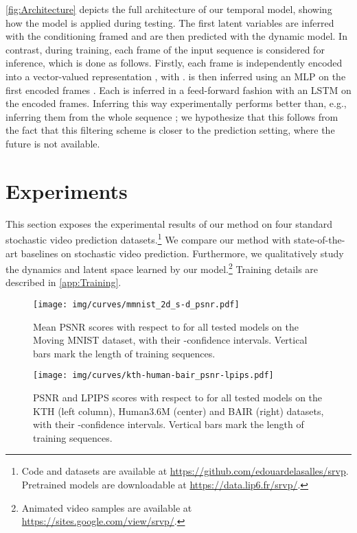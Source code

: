 \documentclass{article}
\begin{document}
\cref{fig:Architecture} depicts the full architecture of our temporal model, showing how the model is applied during testing.
The first latent variables are inferred with the conditioning framed and are then predicted with the dynamic model.
In contrast, during training, each frame of the input sequence is considered for inference, which is done as follows.
Firstly, each frame  is independently encoded into a vector-valued representation , with .
 is then inferred using an MLP on the first  encoded frames .
Each  is inferred in a feed-forward fashion with an LSTM on the encoded frames.
Inferring  this way experimentally performs better than, e.g., inferring them from the whole sequence ; we hypothesize that this follows from the fact that this filtering scheme is closer to the prediction setting, where the future is not available.
 
\section{Experiments}
\label{sec:Experiments}

This section exposes the experimental results of our method on four standard stochastic video prediction datasets.\footnote{Code and datasets are available at \url{https://github.com/edouardelasalles/srvp}. Pretrained models are downloadable at \url{https://data.lip6.fr/srvp/}.}
We compare our method with state-of-the-art baselines on stochastic video prediction.
Furthermore, we qualitatively study the dynamics and latent space learned by our model.\footnote{Animated video samples are available at \url{https://sites.google.com/view/srvp/}.}
Training details are described in \cref{app:Training}.

\begin{figure*}
    \centering
    \texttt{[image: img/curves/mmnist\_2d\_s-d\_psnr.pdf]}
    \vspace{-0.2in}
    \caption{
        \label{fig:res-mmnist-2d}
        Mean PSNR scores with respect to  for all tested models on the Moving MNIST dataset, with their -confidence intervals.
        Vertical bars mark the length of training sequences.
    }
\end{figure*}
 
\begin{figure*}
    \centering
    \texttt{[image: img/curves/kth-human-bair\_psnr-lpips.pdf]}
    \vspace{-0.2in}
    \caption{
        \label{fig:res-kth-human-bair}
        PSNR and LPIPS scores with respect to  for all tested models on the KTH (left column), Human3.6M (center) and BAIR (right) datasets, with their -confidence intervals.
        Vertical bars mark the length of training sequences.
    }
\end{figure*}
 
\end{document}

